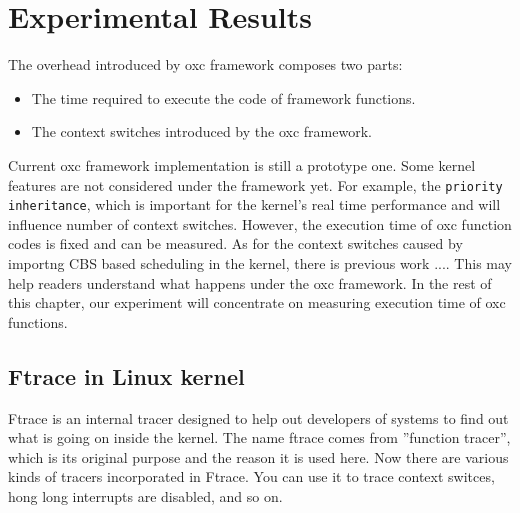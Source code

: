 \chapter{Experimental Results\label{chap:exp}}
The overhead introduced by oxc framework composes two parts:
\begin{itemize}
\item The time required to execute the code of framework functions.
\item The context switches introduced by the oxc framework.
\end{itemize}

Current oxc framework implementation is still a prototype one. Some kernel 
features are not considered under the framework yet. For example, the 
\texttt{priority inheritance}, which is important for the kernel's real time
performance and will influence number of context switches. 
However, the execution time of oxc function codes is fixed and can be measured.
As for the context switches caused by importng CBS based scheduling in the
kernel, there is previous work .... This may help readers understand what 
happens under the oxc framework. In the rest of this chapter, our experiment
will concentrate on measuring execution time of oxc functions.

\section{Ftrace in Linux kernel}
Ftrace is an internal tracer designed to help out developers of systems to
find out what is going on inside the kernel. The name ftrace comes from
''function tracer'', which is its original purpose and the reason it is 
used here. Now there are various kinds of tracers incorporated in Ftrace.
You can use it to trace context switces, hong long interrupts are disabled,
and so on.

